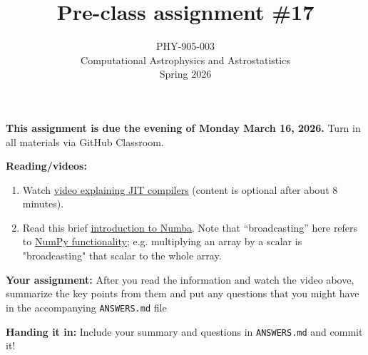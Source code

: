 \documentclass[10pt]{article}
\title{Pre-class assignment \#17}
\author{PHY-905-003\\Computational Astrophysics and
  Astrostatistics\\Spring 2026}
\date{} %
\begin{document}
 
\maketitle

\vspace{-5mm}

\noindent
\textbf{This assignment is due the evening of Monday March 16, 2026.}
 Turn in all materials via GitHub Classroom.

\vspace{5mm}

\noindent
\textbf{Reading/videos:}

\begin{enumerate}

\item Watch \href{https://www.youtube.com/watch?v=d7KHAVaX_Rs}{video
    explaining JIT compilers} (content is optional after about 8
  minutes).
  

\item Read this brief
  \href{https://numba.readthedocs.io/en/stable/user/5minguide.html}{introduction
    to Numba}.  Note that ``broadcasting'' here refers to
  \href{https://numpy.org/doc/stable/user/basics.broadcasting.html}{NumPy
    functionality}; e.g. multiplying an array by a scalar is
  "broadcasting" that scalar to the whole array. 

\end{enumerate}

\noindent
\textbf{Your assignment:}  After you read the information and watch
the video above, summarize the key points from them and put any
questions that you might have in the accompanying \texttt{ANSWERS.md}
file

\noindent
\textbf{Handing it in:}
Include your summary and questions in \texttt{ANSWERS.md} and commit it!
\end{document}
